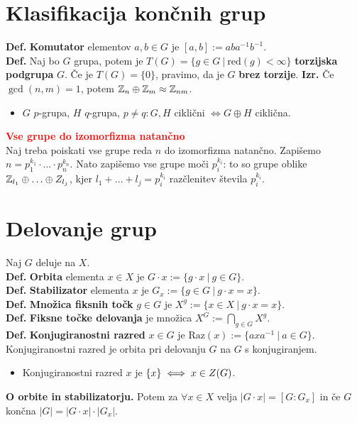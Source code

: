\documentclass[a4paper,oneside,8pt,landscape]{extarticle}
\begin{document}
\begin{multicols*}{3}
\section{Klasifikacija končnih grup}
\textbf{Def.} \textbf{Komutator} elementov $a,b\in G$ je $[a,b]:=aba^{-1}b^{-1}$.\\
\textbf{Def.} Naj bo $G$ grupa, potem je $T(G) = \{g\in G \ | \ \text{red}(g) < \infty \}$ \textbf{torzijska podgrupa} $G$. Če je $T(G) = \{0\}$, pravimo, da je $G$ \textbf{brez torzije}.
\textbf{Izr.} Če \(\gcd(n, m) = 1\), potem \(\mathbb{Z}_n \oplus \mathbb{Z}_m \approx \mathbb{Z}_{nm}\).
%
%
\begin{itemize}
    \item $G$ $p$-grupa, $H$ $q$-grupa, $p\neq q: G,H$ ciklični $\iff G\oplus H$ ciklična.
\end{itemize}
\textbf{\textcolor{red}{Vse grupe do izomorfizma natančno}}\\
Naj treba poiskati vse grupe reda \(n\) do izomorfizma natančno. Zapišemo \(n = p_1^{k_1} \cdot \ldots \cdot p_n^{k_n}\). Nato zapišemo vse grupe moči \(p_i^{k_i}\): to so grupe oblike \(\mathbb{Z}_{l_1} \oplus \ldots \oplus Z_{l_j}\), kjer \(l_1 + \ldots + l_j = p_i^{k_i}\) razčlenitev števila \(p_i^{k_i}\).
%
%
\section{Delovanje grup}
Naj $G$ deluje na $X$.\\
\textbf{Def.} \textbf{Orbita} elementa $x\in X$ je $G\cdot x := \{g\cdot x \ | \ g\in G\}$.\\
\textbf{Def.} \textbf{Stabilizator} elementa $x$ je $G_x := \{g\in G \ | \ g\cdot x = x\}$.\\
\textbf{Def.} \textbf{Množica fiksnih točk} $g\in G$ je $X^g := \{x\in X \ | \ g \cdot x= x\}$.\\
\textbf{Def.} \textbf{Fiksne točke delovanja} je množica $X^G := \bigcap_{g\in G}X^g$.\\
\textbf{Def.} \textbf{Konjugiranostni razred} \(x \in G\) je $\text{Raz}(x) := \{axa^{-1} \ | \ a\in G\}$.\\ Konjugiranostni razred je orbita pri delovanju \(G\) na \(G\) s konjugiranjem.
\begin{itemize}
    \item Konjugiranostni razred \(x\) je \(\{x\} \iff {x \in Z(G)}\).
\end{itemize}
\textbf{O orbite in stabilizatorju.} Potem za $\forall x\in X$ velja $|G\cdot x| = [G:G_x]$ in če $G$ končna $|G| = |G\cdot x| \cdot |G_x|$.
%
%

\end{multicols*}
\end{document}
